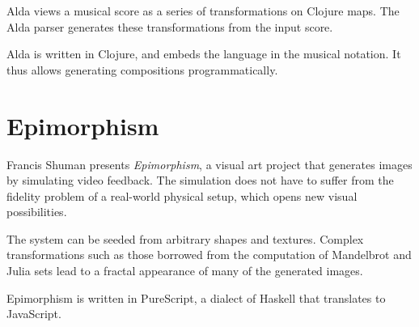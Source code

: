 \documentclass{sigplanconf}
\begin{document}
Alda views a musical score as a series of transformations on Clojure
maps.  The Alda parser generates these transformations from the input
score.

Alda is written in Clojure, and embeds the language in the musical
notation.  It thus allows generating compositions programmatically.

\section{Epimorphism}

Francis Shuman presents \textit{Epimorphism}, a visual art project that
generates images by simulating video feedback.  The simulation does
not have to suffer from the fidelity problem of a real-world physical
setup, which opens new visual possibilities.

The system can be seeded from arbitrary shapes and textures.  Complex
transformations such as those borrowed from the computation of
Mandelbrot and Julia sets lead to a fractal appearance of many of the
generated images.

Epimorphism is written in PureScript, a dialect of Haskell that
translates to JavaScript.
\end{document}
